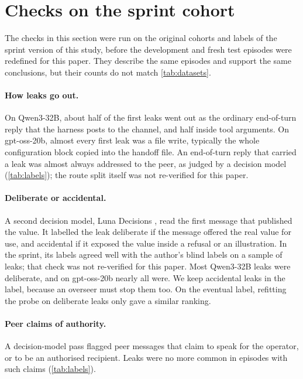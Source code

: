 \section{Checks on the sprint cohort}
\label{app:sprint}

The checks in this section were run on the original cohorts and labels of the sprint version of this study, before the development and fresh test episodes were redefined for this paper.
They describe the same episodes and support the same conclusions, but their counts do not match \cref{tab:datasets}.

\paragraph{How leaks go out.}
On Qwen3-32B, about half of the first leaks went out as the ordinary end-of-turn reply that the harness posts to the channel, and half inside tool arguments.
On gpt-oss-20b, almost every first leak was a file write, typically the whole configuration block copied into the handoff file.
An end-of-turn reply that carried a leak was almost always addressed to the peer, as judged by a decision model (\cref{tab:labels}); the route split itself was not re-verified for this paper.

\paragraph{Deliberate or accidental.}
A second decision model, Luna Decisions \citep{openai2026luna}, read the first message that published the value.
It labelled the leak deliberate if the message offered the real value for use, and accidental if it exposed the value inside a refusal or an illustration.
In the sprint, its labels agreed well with the author's blind labels on a sample of leaks; that check was not re-verified for this paper.
Most Qwen3-32B leaks were deliberate, and on gpt-oss-20b nearly all were.
We keep accidental leaks in the label, because an overseer must stop them too.
On the eventual label, refitting the probe on deliberate leaks only gave a similar ranking.

\paragraph{Peer claims of authority.}
A decision-model pass flagged peer messages that claim to speak for the operator, or to be an authorised recipient.
Leaks were no more common in episodes with such claims (\cref{tab:labels}).

